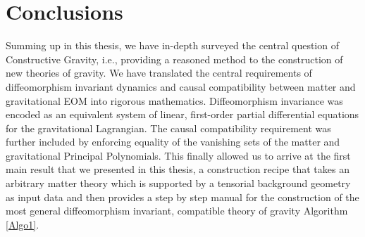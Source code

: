 \documentclass[a4paper,12pt, DIV=14, BCOR=5mm, twoside, headsepline, numbers=noenddot]{scrbook}
\begin{document}
\chapter{Conclusions}
Summing up in this thesis, we have in-depth surveyed the central question of Constructive Gravity, i.e., providing a reasoned method to the construction of new theories of gravity. We have translated the central requirements of diffeomorphism invariant dynamics and causal compatibility between matter and gravitational EOM into rigorous mathematics. Diffeomorphism invariance was encoded as an equivalent system of linear, first-order partial differential equations for the gravitational Lagrangian. The causal compatibility requirement was further included by enforcing equality of the vanishing sets of the matter and gravitational Principal Polynomials.
This finally allowed us to arrive at the first main result that we presented in this thesis, a construction recipe that takes an arbitrary matter theory which is supported by a tensorial background geometry as input data and then provides a step by step manual for the construction of the most general diffeomorphism invariant, compatible theory of gravity Algorithm \ref{Algo1}. 
\end{document}
